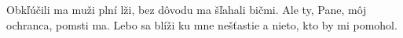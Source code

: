 Obkľúčili ma muži plní lži,
bez dôvodu ma šľahali bičmi.
\versseparator
Ale ty, Pane, môj ochranca, pomsti ma.
\versseparator
Lebo sa blíži ku mne nešťastie
a nieto, kto by mi pomohol. 